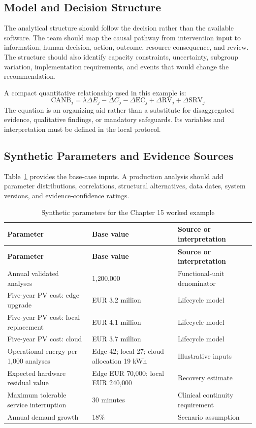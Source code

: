 \subsection{Model and Decision Structure}
The analytical structure should follow the decision rather than the available
software. The team should map the causal pathway from intervention input to
information, human decision, action, outcome, resource consequence, and review.
The structure should also identify capacity constraints, uncertainty, subgroup
variation, implementation requirements, and events that would change the
recommendation.

A compact quantitative relationship used in this example is:
\begin{equation}
\mathrm{CANB}_j=\lambda\Delta E_j-\Delta C_j-\Delta \mathrm{EC}_j+\Delta \mathrm{RV}_j+\Delta \mathrm{SRV}_j
\label{eq:comp-ch15-key-relationship}
\end{equation}
The equation is an organizing aid rather than a substitute for disaggregated evidence,
qualitative findings, or mandatory safeguards. Its variables and interpretation must
be defined in the local protocol.

\subsection{Synthetic Parameters and Evidence Sources}
Table~\ref{tab:comp-ch15-parameters} provides the base-case inputs. A
production analysis should add parameter distributions, correlations, structural
alternatives, data dates, system versions, and evidence-confidence ratings.

\begin{longtable}{@{}p{}p{}p{}@{}}
\caption{Synthetic parameters for the Chapter 15 worked example}
\label{tab:comp-ch15-parameters}\\
\toprule
\textbf{Parameter} & \textbf{Base value} & \textbf{Source or interpretation} \\
\midrule
\endfirsthead
\toprule
\textbf{Parameter} & \textbf{Base value} & \textbf{Source or interpretation} \\
\midrule
\endhead
\bottomrule
\endlastfoot
Annual validated analyses & 1,200,000 & Functional-unit denominator \\
Five-year PV cost: edge upgrade & EUR 3.2 million & Lifecycle model \\
Five-year PV cost: local replacement & EUR 4.1 million & Lifecycle model \\
Five-year PV cost: cloud & EUR 3.7 million & Lifecycle model \\
Operational energy per 1,000 analyses & Edge 42; local 27; cloud allocation 19 kWh & Illustrative inputs \\
Expected hardware residual value & Edge EUR 70,000; local EUR 240,000 & Recovery estimate \\
Maximum tolerable service interruption & 30 minutes & Clinical continuity requirement \\
Annual demand growth & 18\% & Scenario assumption \\
\end{longtable}

